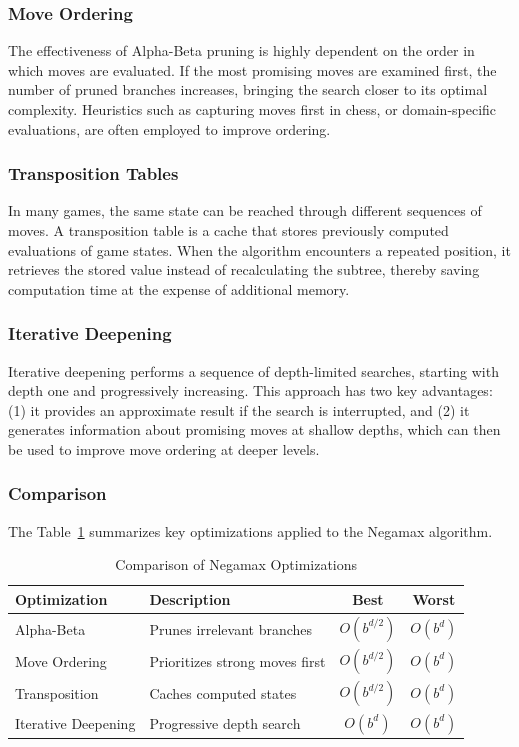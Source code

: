 \documentclass{LSkill}  %
\begin{document}
\subsubsection{Move Ordering}
The effectiveness of Alpha-Beta pruning is highly dependent on the order in which moves are evaluated. 
If the most promising moves are examined first, the number of pruned branches increases, 
bringing the search closer to its optimal complexity. 
Heuristics such as capturing moves first in chess, or domain-specific evaluations, are often employed to improve ordering.

\subsubsection{Transposition Tables}
In many games, the same state can be reached through different sequences of moves. 
A transposition table is a cache that stores previously computed evaluations of game states. 
When the algorithm encounters a repeated position, it retrieves the stored value instead of recalculating the subtree, 
thereby saving computation time at the expense of additional memory.

\subsubsection{Iterative Deepening}
Iterative deepening performs a sequence of depth-limited searches, starting with depth one and progressively increasing. 
This approach has two key advantages: 
(1) it provides an approximate result if the search is interrupted, 
and (2) it generates information about promising moves at shallow depths, 
which can then be used to improve move ordering at deeper levels. 

\subsubsection{Comparison}
The Table~\ref{tab:negamax_optimizations} summarizes key optimizations applied to the Negamax algorithm. 

\begin{table}[h!]
    \centering
    \small
    \setlength{\tabcolsep}{3pt}
    \renewcommand{\arraystretch}{1.1}
    \caption{Comparison of Negamax Optimizations}
    \label{tab:negamax_optimizations}
    \begin{tabular}{|p{2.5cm}|p{4cm}|c|c|}
    \hline
    \textbf{Optimization} & \textbf{Description} & \textbf{Best} & \textbf{Worst} \\ \hline
    Alpha-Beta & Prunes irrelevant branches & $O(b^{d/2})$ & $O(b^d)$ \\ \hline
    Move Ordering & Prioritizes strong moves first & $O(b^{d/2})$ & $O(b^d)$ \\ \hline
    Transposition & Caches computed states & $O(b^{d/2})$ & $O(b^d)$ \\ \hline
    Iterative Deepening & Progressive depth search & $O(b^d)$ & $O(b^d)$ \\ \hline
    \end{tabular}
\end{table}
\end{document}
